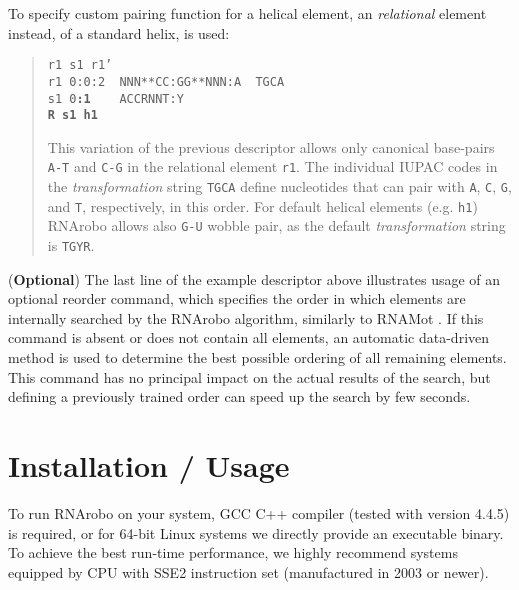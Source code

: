 \documentclass[11pt]{article}
\begin{document}
To specify custom pairing function for a helical element, an \emph{relational} element instead, of a standard helix, is used:
\begin{quote}
\texttt{r1 s1 r1'}\\
\texttt{r1 0:0:2 ~NNN**CC:GG**NNN:A ~TGCA}\\
\texttt{s1 0\textbf{:1} ~~~ACCRNNT:Y} \\
\texttt{\textbf{R s1 h1}}

This variation of the previous descriptor allows only canonical base-pairs \texttt{A-T} and \texttt{C-G} in the relational element \texttt{r1}. The individual IUPAC codes in the \emph{transformation} string \texttt{TGCA} define nucleotides that can pair with \texttt{A}, \texttt{C}, \texttt{G}, and \texttt{T}, respectively, in this order. For default helical elements (e.g. \texttt{h1}) RNArobo allows also \texttt{G-U} wobble pair, as the default \emph{transformation} string is \texttt{TGYR}.
\end{quote}

(\textbf{Optional}) The last line of the example descriptor above illustrates usage of an optional reorder command, which specifies the order in which elements are internally searched by the RNArobo algorithm, similarly to RNAMot \cite{gautheret1990}. If this command is absent or does not contain all elements, an automatic data-driven method is used to determine the best possible ordering of all remaining elements. This command has no principal impact on the actual results of the search, but defining a previously trained order can speed up the search by few seconds.

\section*{Installation / Usage}
To run RNArobo on your system, GCC C++ compiler (tested with version 4.4.5) is required, or for 64-bit Linux systems we directly provide an executable binary. To achieve the best run-time performance, we highly recommend systems equipped by CPU with SSE2 instruction set (manufactured in 2003 or newer).
\end{document}
